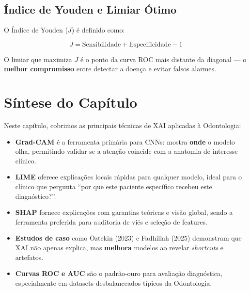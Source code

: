 
\subsection{Índice de Youden e Limiar Ótimo}

O Índice de Youden ($J$) é definido como:

\begin{equation}
  J = \text{Sensibilidade} + \text{Especificidade} - 1
  \label{eq:youden}
\end{equation}

O limiar que maximiza $J$ é o ponto da curva ROC mais distante da
diagonal — o \textbf{melhor compromisso} entre detectar a doença e
evitar falsos alarmes.


\section{Síntese do Capítulo}

Neste capítulo, cobrimos as principais técnicas de XAI aplicadas à
Odontologia:

\begin{itemize}
  \item \textbf{Grad-CAM} é a ferramenta primária para CNNs: mostra
    \textbf{onde} o modelo olha, permitindo validar se a atenção coincide
    com a anatomia de interesse clínico.

  \item \textbf{LIME} oferece explicações locais rápidas para qualquer
    modelo, ideal para o clínico que pergunta ``por que este paciente
    específico recebeu este diagnóstico?''.

  \item \textbf{SHAP} fornece explicações com garantias teóricas e visão
    global, sendo a ferramenta preferida para auditoria de viés e seleção
    de features.

  \item \textbf{Estudos de caso} como Öztekin (2023) e Fadhillah (2025)
    demonstram que XAI não apenas explica, mas \textbf{melhora} modelos
    ao revelar \textit{shortcuts} e artefatos.

  \item \textbf{Curvas ROC e AUC} são o padrão-ouro para avaliação
    diagnóstica, especialmente em datasets desbalanceados típicos da
    Odontologia.
\end{itemize}

